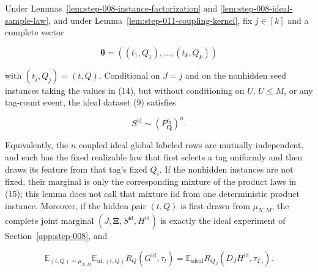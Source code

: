 \begin{lemma}\label{lem:step-011-ideal-marginal}
Under Lemmas~\ref{lem:step-008-instance-factorization} and
\ref{lem:step-008-ideal-sample-law}, and under
Lemma~\ref{lem:step-011-coupling-kernel}, fix \(j\in[k]\) and a complete
vector

\[
  \boldsymbol\theta=((t_1,Q_1),\ldots,(t_k,Q_k))
\tag{14}
\]

with \((t_j,Q_j)=(t,Q)\). Conditional on \(J=j\) and on the nonhidden
seed instances taking the values in (14), but without conditioning on
\(U\), \(U\le M\), or any tag-count event, the ideal dataset (9) satisfies

\[
  S^{\mathrm{id}}\sim
  \left(P_{\boldsymbol Q}^{c_{\boldsymbol t}}\right)^n.
\tag{15}
\]

Equivalently, the \(n\) coupled ideal global labeled rows are mutually independent,
and each has the fixed realizable law that first selects a tag uniformly
and then draws its feature from that tag's fixed \(Q_i\). If the nonhidden
instances are not fixed, their marginal is only the corresponding mixture
of the product laws in (15); this lemma does not call that mixture iid from
one deterministic product instance. Moreover, if the hidden pair
\((t,Q)\) is first drawn from \(\mu_{N,M}\), the complete joint marginal
\((J,\boldsymbol\Xi,S^{\mathrm{id}},H^{\mathrm{id}})\) is exactly the
ideal experiment of Section~\ref{app:step-008}, and

\[
  \mathbb E_{(t,Q)\sim\mu_{N,M}}
    \mathbb E_{\mathrm{id},(t,Q)}R_Q(G^{\mathrm{id}},\tau_t)
  =\mathbb E_{\mathrm{ideal}}
    R_{Q_J}(D_JH^{\mathrm{id}},\tau_{T_J}).
\tag{15a}
\]
\end{lemma}

